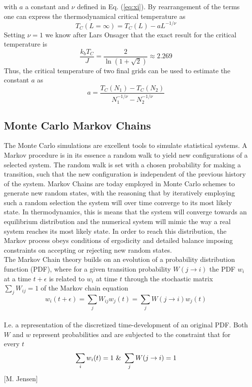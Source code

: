 \documentclass[%
reprint,nofootinbib,
amsmath,amssymb,
aps,
]{revtex4-1}
\begin{document}
with  $a$ a constant and  $\nu$ defined in Eq. (\ref{eq:xi}). By rearrangement of the terms one can express the thermodynamical critical temperature as 
\begin{equation}
	T_C(L=\infty) = T_C(L)-aL^{-1/\nu}
\end{equation}
Setting $\nu = 1$ we know after Lars Onsager that the exact result for the critical temperature is
\begin{equation}
	\dfrac{k_bT_C}{J} = \dfrac{2}{\ln(1+\sqrt{2})} \approx 2.269
\end{equation}
Thus, the critical temperature of two final grids can be used to estimate the constant $a$ as \\ 
\begin{equation}
	a = \dfrac{T_C(N_1)-T_C(N_2)}{N_1^{-1/\nu}-N_2^{-1/\nu}}
\end{equation}


\subsection*{Monte Carlo Markov Chains} \noindent 
The Monte Carlo simulations are excellent tools to simulate statistical systems. A Markov procedure is in its essence a random walk to yield new configurations of a selected system. The random walk is set with a chosen probability for making a transition, such that the new configuration is independent of the previous history of the system. Markov Chains are today employed in Monte Carlo schemes to generate new random states, with the reasoning that by iteratively employing such a random selection the system will over time converge to its most likely state. In thermodynamics, this is means that the system will converge towards an equilibrium distribution and the numerical system will mimic the way a real system reaches its most likely state. In order to reach this distribution, the Markov process obeys conditions of ergodicity and detailed balance imposing constraints on accepting or rejecting new random states. \\ \indent 
The Markov Chain theory builds on an evolution of a probability distribution function (PDF), where for a given transition probability $W(j\rightarrow i)$ the PDF $w_i$ at a time $t+ \epsilon$ is related to $w_i$ at time $t$ through the stochastic matrix $\sum_j W_{ij} = 1$ of the Markov chain equation \\ 
\begin{equation}\label{MCE}
	w_i(t+ \epsilon) = \sum_j W_{ij}w_j(t) = \sum_j W(j\rightarrow i)w_j(t)
\end{equation} \\ 
I.e. a representation of the discretized time-development of an original PDF. Both $W$ and $w$ represent probabilities and are subjected to the constraint that for every $t$ \\ 
\begin{equation*}
	\sum_i w_i(t) = 1 \textnormal{ \& } \sum_j W(j\rightarrow i) = 1
\end{equation*}
\hspace{6.9cm}[M. Jensen] \\
\vspace{6mm}
\end{document}
